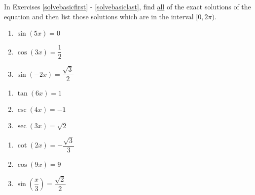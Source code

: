 In Exercises \ref{solvebasicfirst} - \ref{solvebasiclast}, find \underline{all} of the exact solutions of the  equation and then list those solutions which are in the interval $[0, 2\pi)$.

\begin{multicols}{3}

\begin{enumerate}

\item $\sin \left( 5x \right) = 0$  \label{solvebasicfirst}
\item $\cos \left( 3x \right) = \dfrac{1}{2}$ 
\item $\sin \left( -2x \right) = \dfrac{\sqrt{3}}{2}$ 

\setcounter{HW}{\value{enumi}}

\end{enumerate}

\end{multicols}

\begin{multicols}{3}

\begin{enumerate}

\setcounter{enumi}{\value{HW}}

\item $\tan \left( 6x \right) = 1$
\item $\csc \left( 4x \right) = -1$
\item $\sec \left( 3x \right) = \sqrt{2}$

\setcounter{HW}{\value{enumi}}

\end{enumerate}

\end{multicols}

\begin{multicols}{3}

\begin{enumerate}

\setcounter{enumi}{\value{HW}}

\item $\cot \left( 2x \right) = -\dfrac{\sqrt{3}}{3}$
\item $\cos \left( 9x \right) = 9$ 
\item $\sin \left( \dfrac{x}{3} \right) = \dfrac{\sqrt{2}}{2}$

\setcounter{HW}{\value{enumi}}

\end{enumerate}

\end{multicols}

